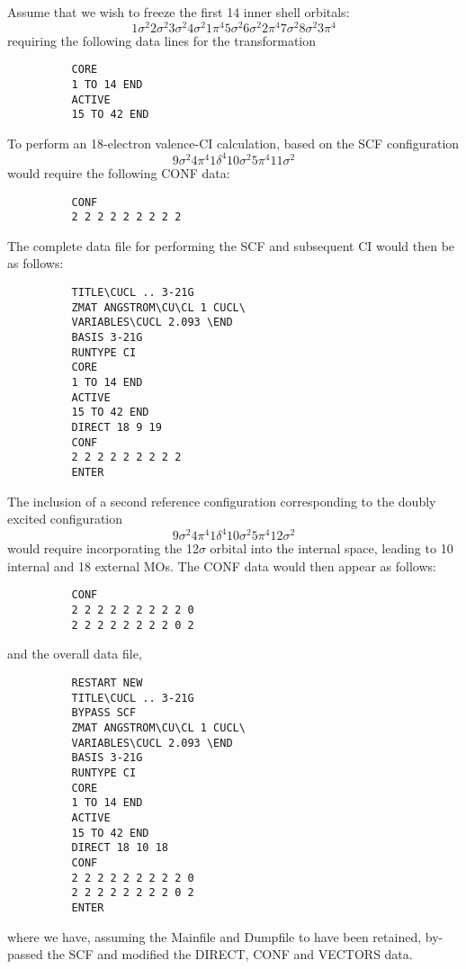 \documentclass[11pt,fleqn]{article}
\begin{document}
Assume that we wish to freeze the first 14 inner shell orbitals:
\begin{equation}
 1\sigma^{2}  2\sigma^{2}   3\sigma^{2}  4\sigma^{2}  1\pi^{4}  5\sigma^{2} 6\sigma^{2}   2\pi^{4}  7\sigma^{2}  8\sigma^{2}  3\pi^{4}  
\end{equation}
requiring the following data lines for the transformation
{
\footnotesize
\begin{verbatim}
          CORE
          1 TO 14 END
          ACTIVE
          15 TO 42 END
\end{verbatim}
}
To perform an 18-electron valence-CI calculation,
based on the SCF configuration 
\begin{equation}
 9\sigma^{2}  4\pi^{4}   1\delta^{4} 10\sigma^{2}  5\pi^{4}  11\sigma^{2} 
\end{equation}
would require the following CONF data:
{
\footnotesize
\begin{verbatim}
          CONF
          2 2 2 2 2 2 2 2 2
\end{verbatim}
}
The complete data file for performing the
SCF and subsequent CI would then be as follows:
{
\footnotesize
\begin{verbatim}
          TITLE\CUCL .. 3-21G
          ZMAT ANGSTROM\CU\CL 1 CUCL\
          VARIABLES\CUCL 2.093 \END 
          BASIS 3-21G
          RUNTYPE CI
          CORE
          1 TO 14 END
          ACTIVE
          15 TO 42 END
          DIRECT 18 9 19
          CONF
          2 2 2 2 2 2 2 2 2 
          ENTER
\end{verbatim}
}
The inclusion of a second reference configuration corresponding to
the doubly excited configuration
\begin{equation}
 9\sigma^{2}  4\pi^{4}   1\delta^{4} 10\sigma^{2}  5\pi^{4}  12\sigma^{2} 
\end{equation}
would require incorporating the 12$\sigma$ orbital into the internal
space, leading to 10 internal and 18 external MOs. The CONF data
would then appear as follows:

{
\footnotesize
\begin{verbatim}
          CONF
          2 2 2 2 2 2 2 2 2 0
          2 2 2 2 2 2 2 2 0 2 
\end{verbatim}
}
and the overall data file,
{
\footnotesize
\begin{verbatim}
          RESTART NEW
          TITLE\CUCL .. 3-21G
          BYPASS SCF
          ZMAT ANGSTROM\CU\CL 1 CUCL\
          VARIABLES\CUCL 2.093 \END 
          BASIS 3-21G
          RUNTYPE CI
          CORE
          1 TO 14 END
          ACTIVE
          15 TO 42 END
          DIRECT 18 10 18
          CONF
          2 2 2 2 2 2 2 2 2 0
          2 2 2 2 2 2 2 2 0 2
          ENTER
\end{verbatim}
}
where we have, assuming the Mainfile and Dumpfile to have
been retained, by-passed the SCF and modified the DIRECT, CONF and
VECTORS data.
\end{document}
